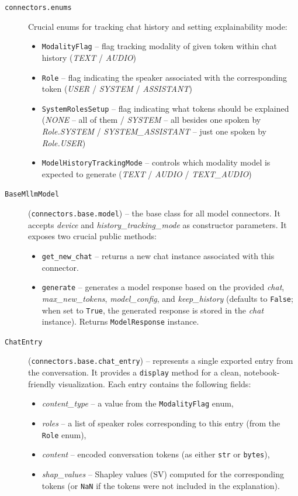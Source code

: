 \begin{appendices}
\begin{description}
    \item[\texttt{connectors.enums}] Crucial enums for tracking chat history and setting explainability mode:
        \begin{itemize}
            \item \texttt{ModalityFlag} -- flag tracking modality of given token within chat history (\textit{TEXT} / \textit{AUDIO})
            \item \texttt{Role} -- flag indicating the speaker associated with the corresponding token (\textit{USER} / \textit{SYSTEM} / \textit{ASSISTANT})
            \item \texttt{SystemRolesSetup} -- flag indicating what tokens should be explained (\textit{NONE} -- all of them / \textit{SYSTEM} -- all besides one spoken by \textit{Role.SYSTEM} / \textit{SYSTEM\_ASSISTANT} -- just one spoken by \textit{Role.USER})
            \item \texttt{ModelHistoryTrackingMode} -- controls which modality model is expected to generate (\textit{TEXT} / \textit{AUDIO} / \textit{TEXT\_AUDIO})
        \end{itemize}

    \item[\texttt{BaseMllmModel}] (\texttt{connectors.base.model}) -- the base class for all model connectors. It accepts \textit{device} and \textit{history\_tracking\_mode} as constructor parameters. It exposes two crucial public methods:
        \begin{itemize}
            \item \texttt{get\_new\_chat} -- returns a new chat instance associated with this connector.
            \item \texttt{generate} – generates a model response based on the provided \textit{chat},
            \textit{max\_new\_tokens}, \textit{model\_config}, and \textit{keep\_history}
            (defaults to \texttt{False}; when set to \texttt{True}, the generated response is stored in the \textit{chat} instance). Returns \texttt{ModelResponse} instance.
        \end{itemize}

    \item[\texttt{ChatEntry}] (\texttt{connectors.base.chat\_entry}) -- represents a single exported entry from the conversation. It provides a \texttt{display} method for a clean, notebook-friendly visualization. Each entry contains the following fields:
    \begin{itemize}
        \item \textit{content\_type} -- a value from the \texttt{ModalityFlag} enum,
        \item \textit{roles} -- a list of speaker roles corresponding to this entry (from the \texttt{Role} enum),
        \item \textit{content} -- encoded conversation tokens (as either \texttt{str} or \texttt{bytes}),
        \item \textit{shap\_values} -- Shapley values (SV) computed for the corresponding tokens (or \texttt{NaN} if the tokens were not included in the explanation).
    \end{itemize}


\end{description}
\end{appendices}

